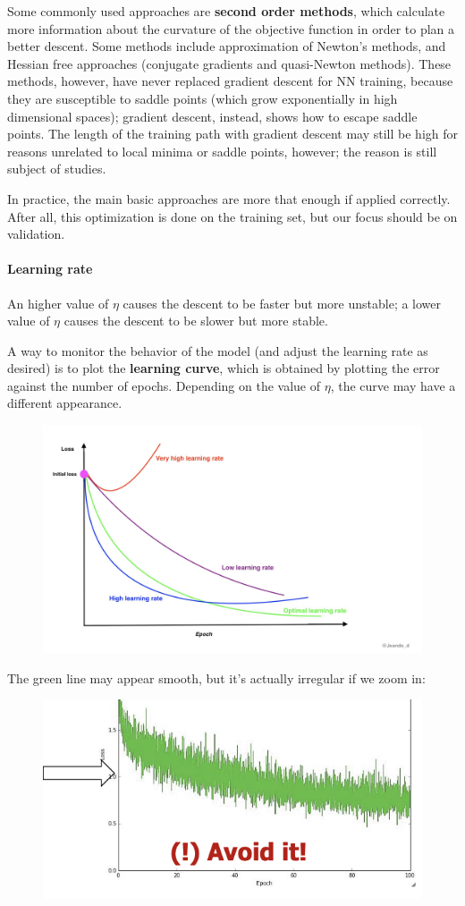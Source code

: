 Some commonly used approaches are \textbf{second order methods}, which calculate more information about the curvature of the objective function in order to plan a better descent. Some methods include approximation of Newton's methods, and Hessian free approaches (conjugate gradients and quasi-Newton methods). These methods, however, have never replaced gradient descent for NN training, because they are susceptible to saddle points (which grow exponentially in high dimensional spaces); gradient descent, instead, shows how to escape saddle points. The length of the training path with gradient descent may still be high for reasons unrelated to local minima or saddle points, however; the reason is still subject of studies.

In practice, the main basic approaches are more that enough if applied correctly. After all, this optimization is done on the training set, but our focus should be on validation.

\paragraph{Learning rate}

An higher value of $\eta$ causes the descent to be faster but more unstable; a lower value of $\eta$ causes the descent to be slower but more stable.

A way to monitor the behavior of the model (and adjust the learning rate as desired) is to plot the \textbf{learning curve}, which is obtained by plotting the error against the number of epochs. Depending on the value of $\eta$, the curve may have a different appearance.

\begin{figure}[h]
    \centering
    \includegraphics[width=0.5\linewidth]{img/Learning curve and eta.png}
\end{figure}
The green line may appear smooth, but it's actually irregular if we zoom in:
\begin{figure}[h]
    \centering
    \includegraphics[width=0.5\linewidth]{img/immagine.png}
\end{figure}

